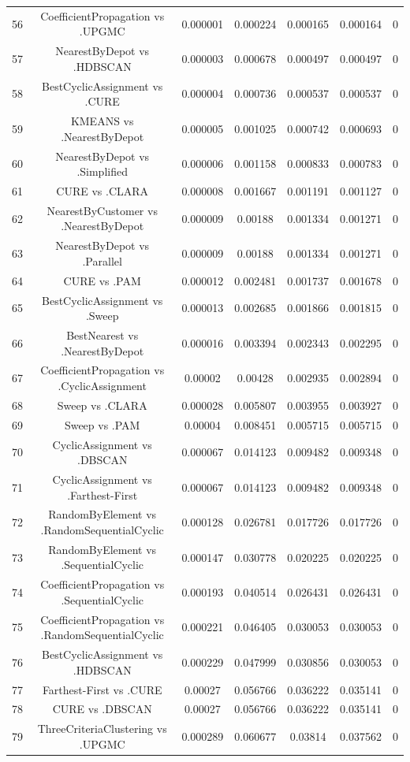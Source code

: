 \documentclass[a4paper,10pt]{article}
\begin{document}
\begin{landscape}
\begin{table}[!htp]
\begin{tabular}{ccccccc}
56&CoefficientPropagation vs .UPGMC&0.000001&0.000224&0.000165&0.000164&0\\
57&NearestByDepot vs .HDBSCAN&0.000003&0.000678&0.000497&0.000497&0\\
58&BestCyclicAssignment vs .CURE&0.000004&0.000736&0.000537&0.000537&0\\
59&KMEANS vs .NearestByDepot&0.000005&0.001025&0.000742&0.000693&0\\
60&NearestByDepot vs .Simplified&0.000006&0.001158&0.000833&0.000783&0\\
61&CURE vs .CLARA&0.000008&0.001667&0.001191&0.001127&0\\
62&NearestByCustomer vs .NearestByDepot&0.000009&0.00188&0.001334&0.001271&0\\
63&NearestByDepot vs .Parallel&0.000009&0.00188&0.001334&0.001271&0\\
64&CURE vs .PAM&0.000012&0.002481&0.001737&0.001678&0\\
65&BestCyclicAssignment vs .Sweep&0.000013&0.002685&0.001866&0.001815&0\\
66&BestNearest vs .NearestByDepot&0.000016&0.003394&0.002343&0.002295&0\\
67&CoefficientPropagation vs .CyclicAssignment&0.00002&0.00428&0.002935&0.002894&0\\
68&Sweep vs .CLARA&0.000028&0.005807&0.003955&0.003927&0\\
69&Sweep vs .PAM&0.00004&0.008451&0.005715&0.005715&0\\
70&CyclicAssignment vs .DBSCAN&0.000067&0.014123&0.009482&0.009348&0\\
71&CyclicAssignment vs .Farthest-First&0.000067&0.014123&0.009482&0.009348&0\\
72&RandomByElement vs .RandomSequentialCyclic&0.000128&0.026781&0.017726&0.017726&0\\
73&RandomByElement vs .SequentialCyclic&0.000147&0.030778&0.020225&0.020225&0\\
74&CoefficientPropagation vs .SequentialCyclic&0.000193&0.040514&0.026431&0.026431&0\\
75&CoefficientPropagation vs .RandomSequentialCyclic&0.000221&0.046405&0.030053&0.030053&0\\
76&BestCyclicAssignment vs .HDBSCAN&0.000229&0.047999&0.030856&0.030053&0\\
77&Farthest-First vs .CURE&0.00027&0.056766&0.036222&0.035141&0\\
78&CURE vs .DBSCAN&0.00027&0.056766&0.036222&0.035141&0\\
79&ThreeCriteriaClustering vs .UPGMC&0.000289&0.060677&0.03814&0.037562&0\\

\end{tabular}
\end{table}
\end{landscape}
\end{document}
